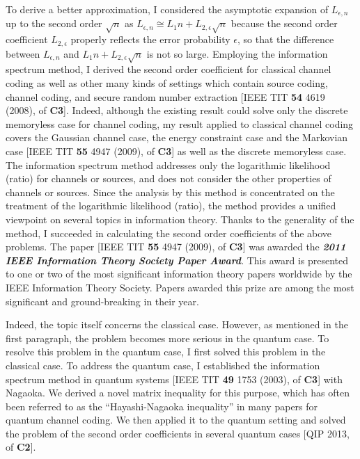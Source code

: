 To derive a better approximation,
I considered the asymptotic expansion of $L_{\epsilon,n}$ up to the second order $\sqrt{n}$
as $L_{\epsilon,n}\cong L_1 n+ L_{2,\epsilon}\sqrt{n}$
because the second order coefficient $L_{2,\epsilon}$ properly reflects the error probability $\epsilon$, 
so that 
the difference between $L_{\epsilon,n}$ and $L_1 n+ L_{2,\epsilon}\sqrt{n}$ is not so large.
Employing the information spectrum method, I derived the second order coefficient for 
classical channel coding as well as other many kinds of settings
which contain source coding, channel coding, and secure random number extraction 
[IEEE TIT \textbf{54} 4619 (2008), \cite{Ha08b-1} of \textbf{C3}]. %
Indeed, although the existing result could solve only the discrete memoryless case for channel coding, 
my result applied to classical channel coding covers 
the Gaussian channel case, the energy constraint case and the Markovian case 
[IEEE TIT \textbf{55} 4947 (2009), \cite{Ha09b} of \textbf{C3}] %
as well as the discrete memoryless case. 
The information spectrum method addresses only the logarithmic likelihood (ratio) for channels or sources, 
and does not consider the other properties of channels or sources. 
Since the analysis by this method is concentrated on the treatment of the logarithmic likelihood (ratio),
the method provides a unified viewpoint on several topics in information theory.
Thanks to the generality of the method, 
I succeeded in calculating the second order coefficients of the above problems.
The paper [IEEE TIT \textbf{55} 4947 (2009), \cite{Ha09b} of \textbf{C3}] was awarded 
the 
\textbf{\textit{2011 IEEE Information Theory Society Paper Award}}.
This award is presented to one or two of the most significant information theory papers worldwide by the IEEE Information Theory Society. 
Papers awarded this prize are among the most significant and ground-breaking in their year.

Indeed, the topic itself concerns the classical case. 
However, as mentioned in the first paragraph, the problem becomes more serious in the quantum case.
To resolve this problem in the quantum case, I first solved this problem in the classical case.
To address the quantum case,
I established the information spectrum method in quantum systems 
[IEEE TIT \textbf{49} 1753 (2003), \cite{HN03b} of \textbf{C3}] %
with Nagaoka.
We derived a novel matrix inequality for this purpose, 
which has often been referred to as the
``Hayashi-Nagaoka inequality'' in many papers for quantum channel coding.
We then applied it to the quantum setting and solved the problem of the second order coefficients 
in several quantum cases [QIP 2013, \cite{THc13-1} of \textbf{C2}].%

